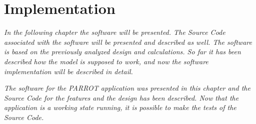 \chapter{Implementation}
\textit{In the following chapter the software will be presented. The Source Code associated with the software will be presented and described as well. The software is based on the previously analyzed design and calculations. So far it has been described how the model is supposed to work, and now the software implementation will be described in detail.}


\textit{The software for the PARROT application was presented in this chapter and the Source Code for the features and the design has been described. Now that the application is a working state running, it is possible to make the tests of the Source Code.}